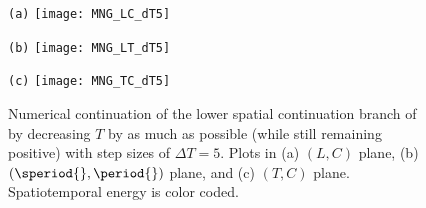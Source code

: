 \begin{figure}
\begin{minipage}[height=.20\textheight]{.30\textwidth}
\centering \small{\texttt{(a)}}
\texttt{[image: MNG\_LC\_dT5]}
\end{minipage}
\begin{minipage}[height=.20\textheight]{.30\textwidth}
\centering \small{\texttt{(b)}}
\texttt{[image: MNG\_LT\_dT5]}
\end{minipage}
\begin{minipage}[height=.20\textheight]{.30\textwidth}
\centering \small{\texttt{(c)}}
\texttt{[image: MNG\_TC\_dT5]}
\end{minipage}
\caption{ \label{fig:MNG_lower_dT5}
Numerical continuation of the lower spatial continuation branch of
 by decreasing $T$ by as much as possible
(while still remaining positive) with step
sizes of $\Delta T = 5$. Plots in (a) $(L,C)$ plane, (b) $(\speriod{},\period{})$ plane, and
(c) $(T,C)$ plane. Spatiotemporal energy is color coded.
}
\end{figure}
